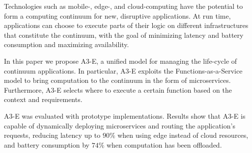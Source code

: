 Technologies such as mobile-, edge-, and cloud-computing have the potential to form a computing continuum for new, disruptive applications. At run time, applications can choose to execute parts of their logic on different infrastructures that constitute the continuum, with the goal of minimizing latency and battery consumption and maximizing availability.

In this paper 
we propose A3-E, a unified model 
for managing the life-cycle of continuum applications. In particular, A3-E exploits the 
Functions-as-a-Service model to bring computation to the continuum in the form of microservices. Furthermore, A3-E selects where to execute a certain function based on the context and requirements.

A3-E was evaluated with prototype implementations. Results show that A3-E is capable of dynamically deploying microservices and routing the application's requests, reducing latency up to $90$\% when using edge instead of cloud resources, and battery consumption by $74$\% when computation has been offloaded.


